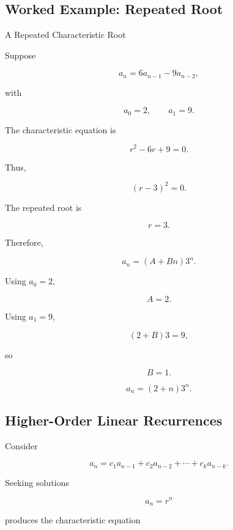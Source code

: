 \subsection{Worked Example: Repeated Root}
\label{subsec:worked-repeated-root}

\begin{workedexamplebox}{A Repeated Characteristic Root}

Suppose

\[
a_n=6a_{n-1}-9a_{n-2},
\]

with

\[
a_0=2,
\qquad
a_1=9.
\]

The characteristic equation is

\[
r^2-6r+9=0.
\]

Thus,

\[
(r-3)^2=0.
\]

The repeated root is

\[
r=3.
\]

Therefore,

\[
a_n=(A+Bn)3^n.
\]

Using \(a_0=2\),

\[
A=2.
\]

Using \(a_1=9\),

\[
(2+B)3=9,
\]

so

\[
B=1.
\]

\begin{answerbox}
\[
\boxed{
a_n=(2+n)3^n.
}
\]
\end{answerbox}

\end{workedexamplebox}

\subsection{Higher-Order Linear Recurrences}
\label{subsec:higher-order-linear-recurrences}

Consider

\[
a_n
=
c_1a_{n-1}
+
c_2a_{n-2}
+\cdots+
c_ka_{n-k}.
\]

Seeking solutions

\[
a_n=r^n
\]

produces the characteristic equation

